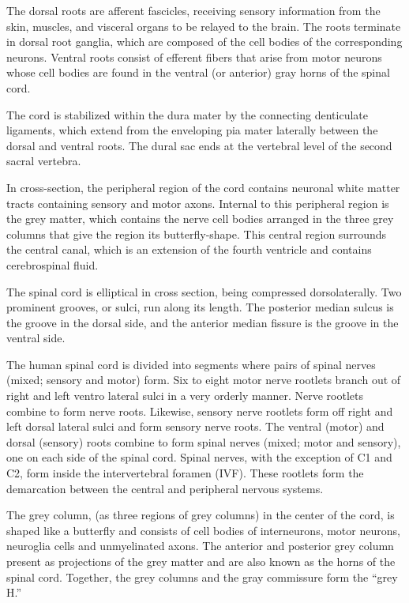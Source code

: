The dorsal roots are afferent fascicles, receiving sensory information from the skin, muscles, and visceral organs to be relayed to the brain. The roots terminate in dorsal root ganglia, which are composed of the cell bodies of the corresponding neurons. Ventral roots consist of efferent fibers that arise from motor neurons whose cell bodies are found in the ventral (or anterior) gray horns of the spinal cord.

The cord is stabilized within the dura mater by the connecting denticulate ligaments, which extend from the enveloping pia mater laterally between the dorsal and ventral roots. The dural sac ends at the vertebral level of the second sacral vertebra.

In cross-section, the peripheral region of the cord contains neuronal white matter tracts containing sensory and motor axons. Internal to this peripheral region is the grey matter, which contains the nerve cell bodies arranged in the three grey columns that give the region its butterfly-shape. This central region surrounds the central canal, which is an extension of the fourth ventricle and contains cerebrospinal fluid.

The spinal cord is elliptical in cross section, being compressed dorsolaterally. Two prominent grooves, or sulci, run along its length. The posterior median sulcus is the groove in the dorsal side, and the anterior median fissure is the groove in the ventral side.

The human spinal cord is divided into segments where pairs of spinal nerves (mixed; sensory and motor) form. Six to eight motor nerve rootlets branch out of right and left ventro lateral sulci in a very orderly manner. Nerve rootlets combine to form nerve roots. Likewise, sensory nerve rootlets form off right and left dorsal lateral sulci and form sensory nerve roots. The ventral (motor) and dorsal (sensory) roots combine to form spinal nerves (mixed; motor and sensory), one on each side of the spinal cord. Spinal nerves, with the exception of C1 and C2, form inside the intervertebral foramen (IVF). These rootlets form the demarcation between the central and peripheral nervous systems.

The grey column, (as three regions of grey columns) in the center of the cord, is shaped like a butterfly and consists of cell bodies of interneurons, motor neurons, neuroglia cells and unmyelinated axons. The anterior and posterior grey column present as projections of the grey matter and are also known as the horns of the spinal cord. Together, the grey columns and the gray commissure form the ``grey H.''

